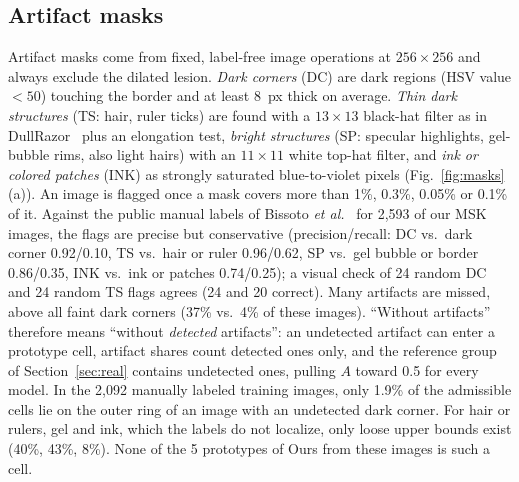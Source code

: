 \documentclass[conference]{IEEEtran}
\begin{document}
\subsection{Artifact masks}
Artifact masks come from fixed, label-free image operations at $256\times256$ and always exclude the dilated lesion. \emph{Dark corners} (DC) are dark regions (HSV value $<50$) touching the border and at least 8~px thick on average. \emph{Thin dark structures} (TS: hair, ruler ticks) are found with a $13\times13$ black-hat filter as in DullRazor~\cite{lee1997} plus an elongation test, \emph{bright structures} (SP: specular highlights, gel-bubble rims, also light hairs) with an $11\times11$ white top-hat filter, and \emph{ink or colored patches} (INK) as strongly saturated blue-to-violet pixels (Fig.~\ref{fig:masks}(a)). An image is flagged once a mask covers more than 1\%, 0.3\%, 0.05\% or 0.1\% of it. Against the public manual labels of Bissoto \emph{et al.}~\cite{bissoto2020} for 2{,}593 of our MSK images, the flags are precise but conservative (precision/recall: DC vs.\ dark corner 0.92/0.10, TS vs.\ hair or ruler 0.96/0.62, SP vs.\ gel bubble or border 0.86/0.35, INK vs.\ ink or patches 0.74/0.25); a visual check of 24 random DC and 24 random TS flags agrees (24 and 20 correct). Many artifacts are missed, above all faint dark corners (37\% vs.\ 4\% of these images). ``Without artifacts'' therefore means ``without \emph{detected} artifacts'': an undetected artifact can enter a prototype cell, artifact shares count detected ones only, and the reference group of Section~\ref{sec:real} contains undetected ones, pulling $A$ toward 0.5 for every model. In the 2{,}092 manually labeled training images, only 1.9\% of the admissible cells lie on the outer ring of an image with an undetected dark corner. For hair or rulers, gel and ink, which the labels do not localize, only loose upper bounds exist (40\%, 43\%, 8\%). None of the 5 prototypes of Ours from these images is such a cell.
\end{document}
